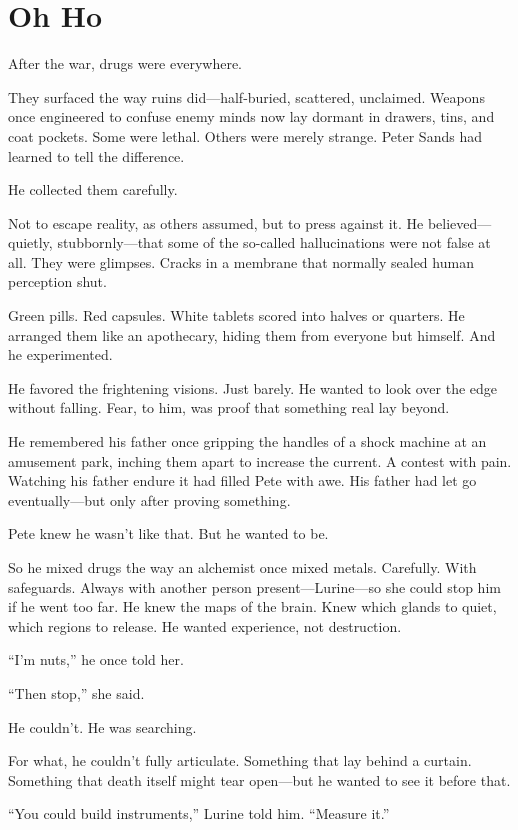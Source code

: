 \chapter{Oh Ho}

After the war, drugs were everywhere.

They surfaced the way ruins did—half-buried, scattered, unclaimed. Weapons once engineered to confuse enemy minds now lay dormant in drawers, tins, and coat pockets. Some were lethal. Others were merely strange. Peter Sands had learned to tell the difference.

He collected them carefully.

Not to escape reality, as others assumed, but to press against it. He believed—quietly, stubbornly—that some of the so-called hallucinations were not false at all. They were glimpses. Cracks in a membrane that normally sealed human perception shut.

Green pills. Red capsules. White tablets scored into halves or quarters. He arranged them like an apothecary, hiding them from everyone but himself. And he experimented.

He favored the frightening visions. Just barely. He wanted to look over the edge without falling. Fear, to him, was proof that something real lay beyond.

He remembered his father once gripping the handles of a shock machine at an amusement park, inching them apart to increase the current. A contest with pain. Watching his father endure it had filled Pete with awe. His father had let go eventually—but only after proving something.

Pete knew he wasn’t like that. But he wanted to be.

So he mixed drugs the way an alchemist once mixed metals. Carefully. With safeguards. Always with another person present—Lurine—so she could stop him if he went too far. He knew the maps of the brain. Knew which glands to quiet, which regions to release. He wanted experience, not destruction.

“I’m nuts,” he once told her.

“Then stop,” she said.

He couldn’t. He was searching.

For what, he couldn’t fully articulate. Something that lay behind a curtain. Something that death itself might tear open—but he wanted to see it before that.

“You could build instruments,” Lurine told him. “Measure it.”


